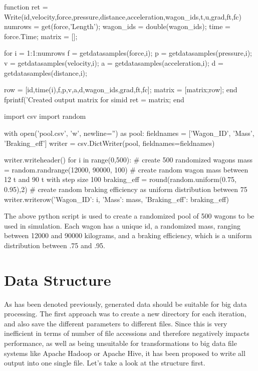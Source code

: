 \begin{matlab}
function ret = Write(id,velocity,force,pressure,distance,acceleration,wagon_ids,t,u,grad,ft,fc)
	numrows = get(force,'Length');
	wagon_ids = double(wagon_ids);
	time = force.Time;
	matrix = [];
	
	for i = 1:1:numrows
		f = getdatasamples(force,i);
		p = getdatasamples(pressure,i);
		v = getdatasamples(velocity,i);
		a = getdatasamples(acceleration,i);
		d = getdatasamples(distance,i);
		
		row = [id,time(i),f,p,v,a,d,wagon_ids,grad,ft,fc]; 	%
		matrix = [matrix;row];
	end
	fprintf('Created output matrix for simid %
	ret = matrix;
end
\end{matlab}

\begin{python}
import csv
import random

with open('pool.csv', 'w', newline='') as pool:
	fieldnames = ['Wagon_ID', 'Mass', 'Braking_eff']
	writer = csv.DictWriter(pool, fieldnames=fieldnames)
	
	writer.writeheader()
	for i in range(0,500): # create 500 randomized wagons
		mass = random.randrange(12000, 90000, 100) # create random wagon mass between 12 t and 90 t with step size 100
		braking_eff = round(random.uniform(0.75, 0.95),2) # create random braking efficiency as uniform distribution between 75 %
		writer.writerow({'Wagon_ID': i, 'Mass': mass, 'Braking_eff': braking_eff})
\end{python}

\par\noindent
The above python script is used to create a randomized pool of 500 wagons to be used in simulation. Each wagon has a unique id, a randomized mass, ranging between 12000 and 90000 kilograms, and a braking efficiency, which is a uniform distribution between .75 and .95.

\section{Data Structure}
\label{sec:DataStructure}
\par\noindent
As has been denoted previously, generated data should be suitable for big data processing. The first approach was to create a new directory for each iteration, and also save the different parameters to different files. Since this is very inefficient in terms of number of file accessions and therefore negatively impacts performance, as well as being unsuitable for transformations to big data file systems like Apache Hadoop or Apache Hive, it has been proposed to write all output into one single file. Let's take a look at the structure first.

